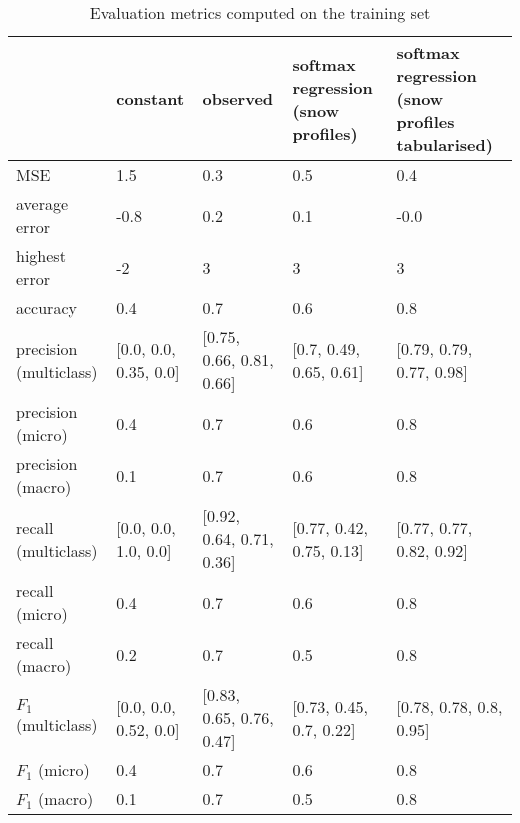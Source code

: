 \begin{table}[H]
\caption{Evaluation metrics computed on the training set}
\label{tbl:sais_eval_training}
\begin{tabular}{lllll}
\toprule
 & constant & observed & softmax regression (snow profiles) & softmax regression (snow profiles tabularised) \\
\midrule
MSE & 1.5 & 0.3 & 0.5 & 0.4 \\
average error & -0.8 & 0.2 & 0.1 & -0.0 \\
highest error & -2 & 3 & 3 & 3 \\
accuracy & 0.4 & 0.7 & 0.6 & 0.8 \\
precision (multiclass) & [0.0, 0.0, 0.35, 0.0] & [0.75, 0.66, 0.81, 0.66] & [0.7, 0.49, 0.65, 0.61] & [0.79, 0.79, 0.77, 0.98] \\
precision (micro) & 0.4 & 0.7 & 0.6 & 0.8 \\
precision (macro) & 0.1 & 0.7 & 0.6 & 0.8 \\
recall (multiclass) & [0.0, 0.0, 1.0, 0.0] & [0.92, 0.64, 0.71, 0.36] & [0.77, 0.42, 0.75, 0.13] & [0.77, 0.77, 0.82, 0.92] \\
recall (micro) & 0.4 & 0.7 & 0.6 & 0.8 \\
recall (macro) & 0.2 & 0.7 & 0.5 & 0.8 \\
$F_1$ (multiclass) & [0.0, 0.0, 0.52, 0.0] & [0.83, 0.65, 0.76, 0.47] & [0.73, 0.45, 0.7, 0.22] & [0.78, 0.78, 0.8, 0.95] \\
$F_1$ (micro) & 0.4 & 0.7 & 0.6 & 0.8 \\
$F_1$ (macro) & 0.1 & 0.7 & 0.5 & 0.8 \\
\bottomrule
\end{tabular}
\end{table}
